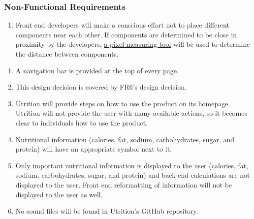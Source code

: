 \documentclass[12pt, titlepage]{article}
\begin{document}
\subsubsection{Non-Functional Requirements}
\begin{enumerate}[{LF}1. ]
	\item Front end developers will make a conscious effort not to place different components near each other. If components are determined to be close in proximity by the developers, \href{https://www.rapidtables.com/web/tools/pixel-ruler.html}{a pixel measuring tool} will be used to determine the distance between components.
\end{enumerate}

\begin{enumerate}[{UH}1. ]
	\item A navigation bar is provided at the top of every page.
	\item This design decision is covered by FR6's design decision.
	\item Utrition will provide steps on how to use the product on its homepage. Utrition will not provide the user with many available actions, so it becomes clear to individuals how to use the product. 
	\item Nutritional information (calories, fat, sodium, carbohydrates, sugar, and protein) will have an appropriate symbol next to it.
	\item Only important nutritional information is displayed to the user (calories, fat, sodium, carbohydrates, sugar, and protein) and back-end calculations are not displayed to the user. Front end reformatting of information will not be displayed to the user as well.
	\item No sound files will be found in Utrition's GitHub repository.
\end{enumerate}
\end{document}
